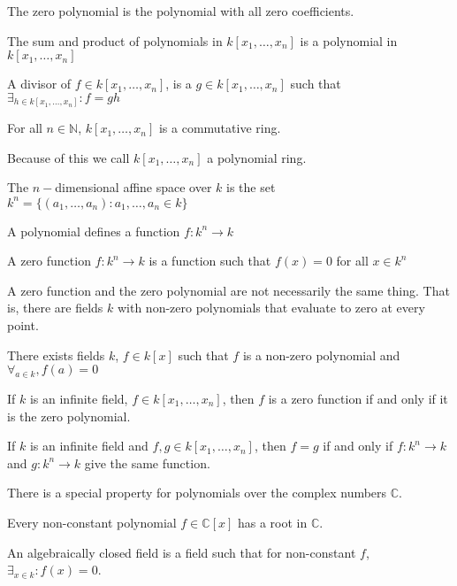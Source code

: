 \documentclass[crop=false,class=book]{standalone}
\begin{document}
\begin{definition}
The zero polynomial is the polynomial with all zero coefficients.
\end{definition}
\begin{theorem}
The sum and product of polynomials in $k[x_1,\hdots ,x_n]$ is a polynomial in $k[x_1,\hdots ,x_n]$
\end{theorem}
\begin{definition}
A divisor of $f\in k[x_{1},\hdots ,x_{n}]$, is a $g\in k[x_{1},\hdots,x_{n}]$ such that $\exists_{h\in k[x_{1},\hdots,x_{n}]}:f = gh$
\end{definition}
\begin{theorem}
For all $n\in\mathbb{N}$, $k[x_1,\hdots ,x_n]$ is a commutative ring.
\end{theorem}
\begin{remark}
Because of this we call $k[x_1,\hdots ,x_n]$ a polynomial ring.
\end{remark}
\begin{definition}
The $n-$dimensional affine space over $k$ is the set $k^{n}=\{(a_1,\hdots, a_n):a_1,\hdots,a_n \in k\}$
\end{definition}
\begin{remark}
A polynomial defines a function $f:k^n \rightarrow k$
\end{remark}
\begin{definition}
A zero function $f:k^n \rightarrow k$ is a function such that $f(x) = 0$ for all $x\in k^n$
\end{definition}
\begin{remark}
A zero function and the zero polynomial are not necessarily the same thing. That is, there are fields $k$ with non-zero polynomials that evaluate to zero at every point.
\end{remark}
\begin{theorem}
There exists fields $k$, $f\in k[x]$ such that $f$ is a non-zero polynomial and $\forall_{a\in k},f(a)=0$
\end{theorem}
\begin{theorem}
If $k$ is an infinite field, $f\in k[x_1,\hdots ,x_n]$, then $f$ is a zero function if and only if it is the zero polynomial.
\end{theorem}
\begin{theorem}
If $k$ is an infinite field and $f,g\in k[x_1,\hdots ,x_n]$, then $f=g$ if and only if $f:k^n\rightarrow k$ and $g:k^n \rightarrow k$ give the same function.
\end{theorem}
There is a special property for polynomials over the complex numbers $\mathbb{C}$.
\begin{theorem}
Every non-constant polynomial $f\in \mathbb{C}[x]$ has a root in $\mathbb{C}$.
\end{theorem}
\begin{definition}
An algebraically closed field is a field such that for non-constant $f$, $\exists_{x\in k}:f(x)=0$.
\end{definition}
\end{document}
